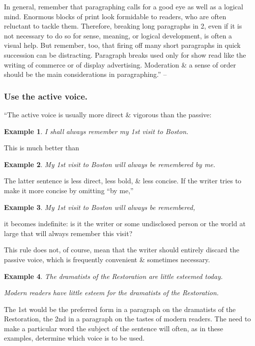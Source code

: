 \documentclass{article}
\newtheorem{example}{Example}
\begin{document}
In general, remember that paragraphing calls for a good eye as well as a logical mind. Enormous blocks of print look formidable to readers, who are often reluctant to tackle them. Therefore, breaking long paragraphs in 2, even if it is not necessary to do so for sense, meaning, or logical development, is often a visual help. But remember, too, that firing off many short paragraphs in quick succession can be distracting. Paragraph breaks used only for show read like the writing of commerce or of display advertising. Moderation \& a sense of order should be the main considerations in paragraphing.'' -- \cite[pp. 30--31]{Strunk_White_element_style}


\subsubsection{Use the active voice.}
``The active voice is usually more direct \& vigorous than the passive:
\begin{example}
	I shall always remember my 1st visit to Boston.
\end{example}
This is much better than
\begin{example}
	My 1st visit to Boston will always be remembered by me.
\end{example}
The latter sentence is less direct, less bold, \& less concise. If the writer tries to make it more concise by omitting ``by me,''
\begin{example}
	My 1st visit to Boston will always be remembered,
\end{example}
it becomes indefinite: is it the writer or some undisclosed person or the world at large that will always remember this visit?

This rule does not, of course, mean that the writer should entirely discard the passive voice, which is frequently convenient \& sometimes necessary.
\begin{example}
	The dramatists of the Restoration are little esteemed today.
	
	Modern readers have little esteem for the dramatists of the Restoration.
\end{example}
The 1st would be the preferred form in a paragraph on the dramatists of the Restoration, the 2nd in a paragraph on the tastes of modern readers. The need to make a particular word the subject of the sentence will often, as in these examples, determine which voice is to be used.
\end{document}
